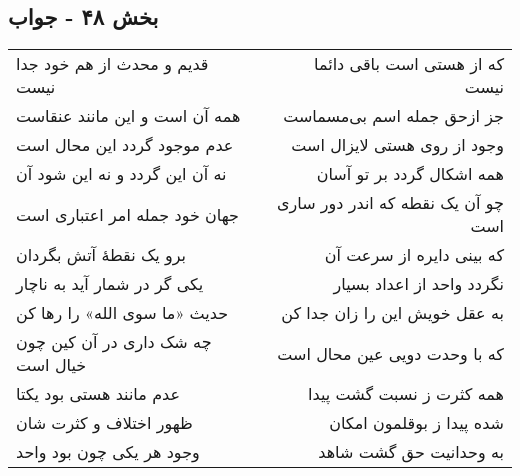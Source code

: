 \begin{center}
\section*{بخش ۴۸ - جواب}
\label{sec:sh048}
\begin{longtable}{l p{0.5cm} r}
قدیم و محدث از هم خود جدا نیست
&&
که از هستی است باقی دائما نیست
\\
همه آن است و این مانند عنقاست
&&
جز ازحق جمله اسم بی‌مسماست
\\
عدم موجود گردد این محال است
&&
وجود از روی هستی لایزال است
\\
نه آن این گردد و نه این شود آن
&&
همه اشکال گردد بر تو آسان
\\
جهان خود جمله امر اعتباری است
&&
چو آن یک نقطه که اندر دور ساری است
\\
برو یک نقطهٔ آتش بگردان
&&
که بینی دایره از سرعت آن
\\
یکی گر در شمار آید به ناچار
&&
نگردد واحد از اعداد بسیار
\\
حدیث «ما سوی الله» را رها کن
&&
به عقل خویش این را زان جدا کن
\\
چه شک داری در آن کین چون خیال است
&&
که با وحدت دویی عین محال است
\\
عدم مانند هستی بود یکتا
&&
همه کثرت ز نسبت گشت پیدا
\\
ظهور اختلاف و کثرت شان
&&
شده پیدا ز بوقلمون امکان
\\
وجود هر یکی چون بود واحد
&&
به وحدانیت حق گشت شاهد
\\
\end{longtable}
\end{center}
